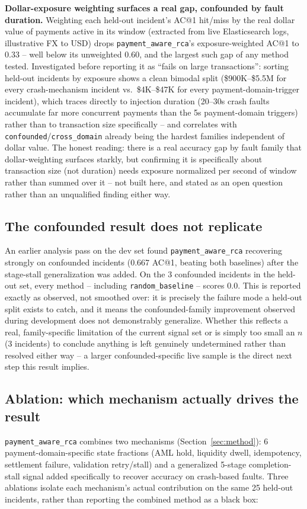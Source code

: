 \documentclass[conference]{IEEEtran}
\begin{document}
\textbf{Dollar-exposure weighting surfaces a real gap, confounded by
fault duration.} Weighting each held-out incident's AC@1 hit/miss by the
real dollar value of payments active in its window (extracted from live
Elasticsearch logs, illustrative FX to USD) drops
\texttt{payment\_aware\_rca}'s exposure-weighted AC@1 to 0.33 -- well
below its unweighted 0.60, and the largest such gap of any method tested.
Investigated before reporting it as ``fails on large transactions'':
sorting held-out incidents by exposure shows a clean bimodal split
(\$900K--\$5.5M for every crash-mechanism incident vs.\ \$4K--\$47K for
every payment-domain-trigger incident), which traces directly to
injection duration (20--30s crash faults accumulate far more concurrent
payments than the 5s payment-domain triggers) rather than to transaction
size specifically -- and correlates with \texttt{confounded}/\texttt{cross\_domain}
already being the hardest families independent of dollar value. The
honest reading: there is a real accuracy gap by fault family that
dollar-weighting surfaces starkly, but confirming it is specifically about
transaction size (not duration) needs exposure normalized per second of
window rather than summed over it -- not built here, and stated as an
open question rather than an unqualified finding either way.

\subsection{The confounded result does not replicate}
\label{sec:eval-confounded}
An earlier analysis pass on the dev set found \texttt{payment\_aware\_rca}
recovering strongly on confounded incidents (0.667 AC@1, beating both
baselines) after the stage-stall generalization was added. On the 3
confounded incidents in the held-out set, every method -- including
\texttt{random\_baseline} -- scores 0.0. This is reported exactly as
observed, not smoothed over: it is precisely the failure mode a held-out
split exists to catch, and it means the confounded-family improvement
observed during development does not demonstrably generalize. Whether
this reflects a real, family-specific limitation of the current signal set
or is simply too small an $n$ (3 incidents) to conclude anything is left
genuinely undetermined rather than resolved either way -- a larger
confounded-specific live sample is the direct next step this result
implies.

\subsection{Ablation: which mechanism actually drives the result}
\label{sec:ablation}
\texttt{payment\_aware\_rca} combines two mechanisms (Section~\ref{sec:method}):
6 payment-domain-specific state fractions (AML hold, liquidity dwell,
idempotency, settlement failure, validation retry/stall) and a generalized
5-stage completion-stall signal added specifically to recover accuracy on
crash-based faults. Three ablations isolate each mechanism's actual
contribution on the same 25 held-out incidents, rather than reporting the
combined method as a black box:
\end{document}
